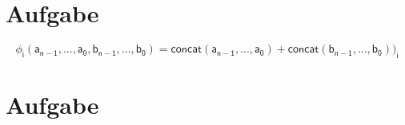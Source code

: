 \documentclass[11pt]{amsart}
\begin{document}
\section{Aufgabe}
$$
\mathsf{
\phi_i(a_{n-1},...,a_0,b_{n-1},...,b_0) = concat(a_{n-1},...,a_0) + concat(b_{n-1},...,b_0))_i}
$$
\section{Aufgabe}
\end{document}
